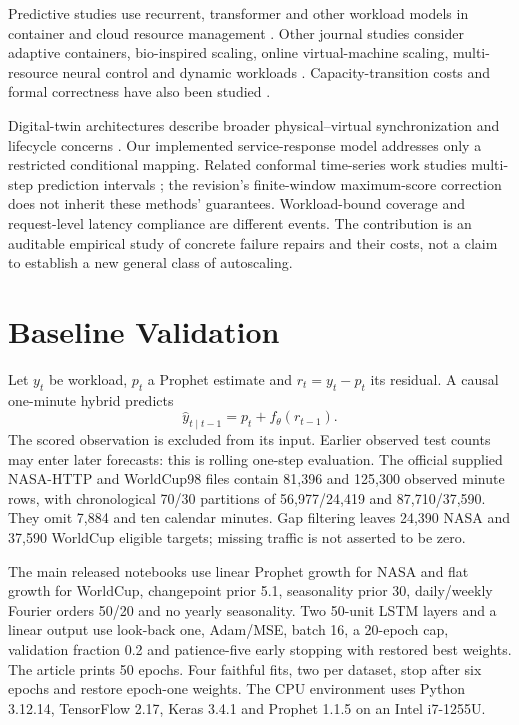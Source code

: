 \documentclass[10pt,twocolumn,a4paper]{article}
\begin{document}
Predictive studies use recurrent, transformer and other workload models in container and cloud resource management \cite{j05,j13,j15,j16,j18,j22,j23,j25,j29}. Other journal studies consider adaptive containers, bio-inspired scaling, online virtual-machine scaling, multi-resource neural control and dynamic workloads \cite{j07,j10,j11,j14,j17}. Capacity-transition costs and formal correctness have also been studied \cite{j12,j27}.

Digital-twin architectures describe broader physical--virtual synchronization and lifecycle concerns \cite{j19,j28}. Our implemented service-response model addresses only a restricted conditional mapping. Related conformal time-series work studies multi-step prediction intervals \cite{j20,j21}; the revision's finite-window maximum-score correction does not inherit these methods' guarantees. Workload-bound coverage and request-level latency compliance are different events. The contribution is an auditable empirical study of concrete failure repairs and their costs, not a claim to establish a new general class of autoscaling.

\section{Baseline Validation}
Let $y_t$ be workload, $p_t$ a Prophet estimate and $r_t=y_t-p_t$ its residual. A causal one-minute hybrid predicts
\begin{equation}\widehat y_{t\mid t-1}=p_t+f_\theta(r_{t-1}).\end{equation}
The scored observation is excluded from its input. Earlier observed test counts may enter later forecasts: this is rolling one-step evaluation. The official supplied NASA-HTTP and WorldCup98 files contain 81,396 and 125,300 observed minute rows, with chronological 70/30 partitions of 56,977/24,419 and 87,710/37,590. They omit 7,884 and ten calendar minutes. Gap filtering leaves 24,390 NASA and 37,590 WorldCup eligible targets; missing traffic is not asserted to be zero.

The main released notebooks use linear Prophet growth for NASA and flat growth for WorldCup, changepoint prior 5.1, seasonality prior 30, daily/weekly Fourier orders 50/20 and no yearly seasonality. Two 50-unit LSTM layers and a linear output use look-back one, Adam/MSE, batch 16, a 20-epoch cap, validation fraction 0.2 and patience-five early stopping with restored best weights. The article prints 50 epochs. Four faithful fits, two per dataset, stop after six epochs and restore epoch-one weights. The CPU environment uses Python 3.12.14, TensorFlow 2.17, Keras 3.4.1 and Prophet 1.1.5 on an Intel i7-1255U.
\end{document}
